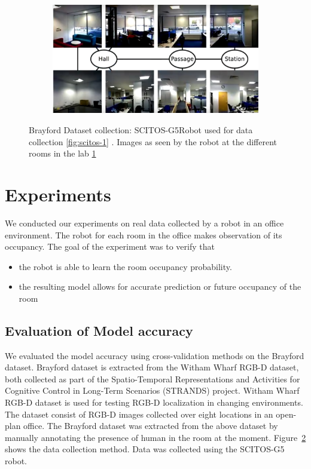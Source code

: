 \begin{figure}
    \begin{subfigure}[b]{0.6\textwidth}
        \includegraphics[width=\textwidth]{images/kth-dataset-2.png}
        \caption{}
        \label{fig:robot-view-1}
    \end{subfigure}
    \caption[Brayford dataset collection]{Brayford Dataset collection: SCITOS-G5\footnotemark Robot used for data collection \ref{fig:scitos-1} \protect. Images \footnotemark as seen by the robot at the different rooms in the lab \ref{fig:robot-view-1}}\label{fig:brayford-dataset}
\end{figure}



\section{Experiments}
We conducted our experiments on real data collected by a robot in an office environment. The robot for each room in the office makes observation of its occupancy. The goal of the experiment was to verify that
\begin{itemize}
    \item the robot is able to learn the room occupancy probability.
	\item the resulting model allows for accurate prediction or future occupancy of the room
\end{itemize}

\subsection{Evaluation of Model accuracy}

We evaluated the model accuracy using cross-validation methods on the Brayford dataset. Brayford dataset is extracted from the Witham Wharf RGB-D dataset, both collected as part of the Spatio-Temporal Representations and Activities for Cognitive Control in Long-Term Scenarios (STRANDS) project. 
Witham Wharf RGB-D dataset is used for testing RGB-D localization in changing environments. The dataset consist of RGB-D images collected over eight locations in an open-plan office. The Brayford dataset was extracted from the above dataset by manually annotating the presence of human in the room at the moment. Figure~\ref{fig:brayford-dataset} shows the data collection method. Data was collected using the SCITOS-G5 robot. 



